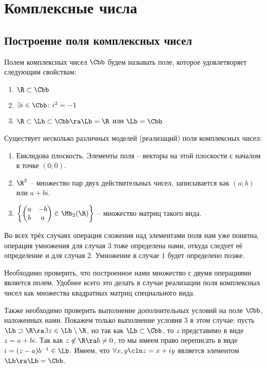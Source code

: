 \newpage
\section{Комплексные числа}
\label{complex}
%

\subsection{Построение поля комплексных чисел}

Полем комплексных чисел $\Cbb$ будем называть поле, которое удовлетворяет следующим свойствам:
\begin{enumerate}
  \item $\R\subset\Cbb$
  \item $\exists i\in\Cbb\colon i^2=-1$
  \item $\R\subset\Lb\subset\Cbb\ra\Lb=\R$ или $\Lb=\Cbb$
\end{enumerate}

Существует несколько различных моделей (реализаций) поля комплексных чисел:
\begin{enumerate}
  \item Евклидова плоскость. Элементы поля -- векторы на этой плоскости с началом в точке $(0;0)$.
  \item $\R^2$ -- множество пар двух действительных чисел, записывается как $(a;b)$ или $a+bi$.
  \item $\left\{\left(\begin{matrix}a&-b\\ b&a\end{matrix}\right)\in\Mb_2(\R) \right\}$ -- множество матриц такого вида.
\end{enumerate}

Во всех трёх случаях операция сложения над элементами поля нам уже понятна, операция умножения для случая 3 тоже определена нами, откуда следует её определение и для случая 2. Умножение в случае 1 будет определено позже.

Необходимо проверить, что построенное нами множество с двумя операциями является полем. Удобнее всего это делать в случае реализации поля комплексных чисел как множества квадратных матриц специального вида.

Также необходимо проверить выполнение дополнительных условий на поле $\Cbb$, наложенных нами. Покажем только выполнение условия 3 в этом случае: пусть $\Lb\supset\R\ra \exists z\in\Lb\setminus\R$, но так как $\Lb\subset\Cbb$, то $z$ представимо в виде $z=a+bi$. Так как $z\not\in\R\ra b\ne0$, то мы имеем право переписать в виде $i=(z-a)b^{-1}\in\Lb$. Имеем, что $\forall x,y\cln z=x+iy$ является элементом $\Lb\ra\Lb=\Cbb$.

